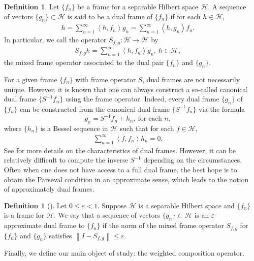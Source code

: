 \documentclass{amsart}
\theoremstyle{definition}
\newtheorem{definition}[thm]{Definition}
\theoremstyle{remark}
\numberwithin{equation}{section}
\newcommand{\ip}[2]{\left\langle {#1} , {#2} \right\rangle} %
\newcommand{\norm}[1]{\left\lVert #1 \right\rVert} %
\begin{document}
\begin{definition}
    Let $\{f_{n}\}$ be a frame for a separable Hilbert space $\mathcal{H}$. A sequence of vectors $\{g_{n}\}\subset \mathcal{H}$ is said to be a dual frame of  $\{f_{n}\}$ if for each $h\in \mathcal{H}$,
    \begin{align*}
        h=\sum_{n=1}^{\infty}\ip{h}{f_{n}}g_{n}=\sum_{n=1}^{\infty}\ip{h}{g_{n}}f_{n}.
    \end{align*}
    In particular, we call the operator $S_{f,g}:\mathcal{H}\to \mathcal{H}$ by 
    \begin{align*}
        S_{f,g}h=\sum_{n=1}^{\infty}\ip{h}{f_{n}}g_{n}, \ h \in \mathcal{H},
    \end{align*}
    the mixed frame operator associated to the dual pair $\{f_{n}\}$ and $\{g_{n}\}$. 
\end{definition}
For a given frame $\{f_{n}\}$ with frame operator $S$, dual frames are not necessarily unique. However, it is known that one can always construct a so-called canonical dual frame $\{S^{-1}f_{n}\}$ using the frame operator. Indeed, every dual frame $\{g_n\}$ of $\{f_n\}$ can be constructed from the canonical dual frame $\{S^{-1}f_{n}\}$ via the formula
\begin{equation*}
    g_{n}=S^{-1}f_{n}+h_{n}, \ \text{for each $n$},
\end{equation*}
where $\{h_{n}\}$ is a Bessel sequence in $\mathcal{H}$ such that for each $f\in\mathcal{H}$,
\begin{align*}
    \sum_{n=1}^{\infty}\ip{f}{f_{n}}h_{n}=0.
\end{align*}
See \cite{christensen2003introduction} for more details on the characteristics of dual frames. 
However, it can be relatively difficult to compute the inverse $S^{-1}$ depending on the circumstances. Often when one does not have access to a full dual frame, the best hope is to obtain the Parseval condition in an approximate sense, which leads to the notion of approximately dual frames. 
\begin{definition}[\cite{CL10}]\label{def_approx_dual}
    Let $0\leq\varepsilon<1$. Suppose $\mathcal{H}$ is a separable Hilbert space and $\{f_{n}\}$ is a frame for $\mathcal{H}$. We say that a sequence of vectors $\{g_{n}\} \subset \mathcal{H}$ is an $\varepsilon$-approximate dual frame to $\{f_{n}\}$ if the norm of the mixed frame operator $S_{f,g}$ for $\{f_n\}$ and $\{g_n\}$ satisfies 
    $\norm{I-S_{f,g}}\leq\varepsilon$. 
\end{definition}
Finally, we define our main object of study: the weighted composition operator. 
\end{document}
